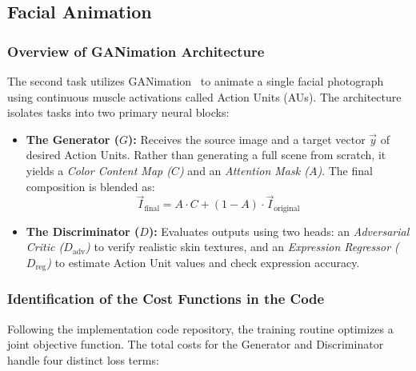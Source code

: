 \documentclass{article}
\begin{document}
\subsection{Facial Animation}

\subsubsection{Overview of GANimation Architecture}

The second task utilizes GANimation~\cite{pumarola2020ganimation} to animate a single facial photograph using continuous muscle activations called Action Units (AUs). The architecture isolates tasks into two primary neural blocks:
\begin{itemize}
    \item \textbf{The Generator ($G$):} Receives the source image and a target vector $\vec{y}$ of desired Action Units. Rather than generating a full scene from scratch, it yields a \textit{Color Content Map ($C$)} and an \textit{Attention Mask ($A$)}. The final composition is blended as:
    \begin{equation}
        \vec{I}_{\text{final}} = A \cdot C + (1 - A) \cdot \vec{I}_{\text{original}}
    \end{equation}
    \item \textbf{The Discriminator ($D$):} Evaluates outputs using two heads: an \textit{Adversarial Critic ($D_{\text{adv}}$)} to verify realistic skin textures, and an \textit{Expression Regressor ($D_{\text{reg}}$)} to estimate Action Unit values and check expression accuracy.
\end{itemize}

\subsubsection{Identification of the Cost Functions in the Code}
Following the implementation code repository, the training routine optimizes a joint objective function. The total costs for the Generator and Discriminator handle four distinct loss terms:
\end{document}
